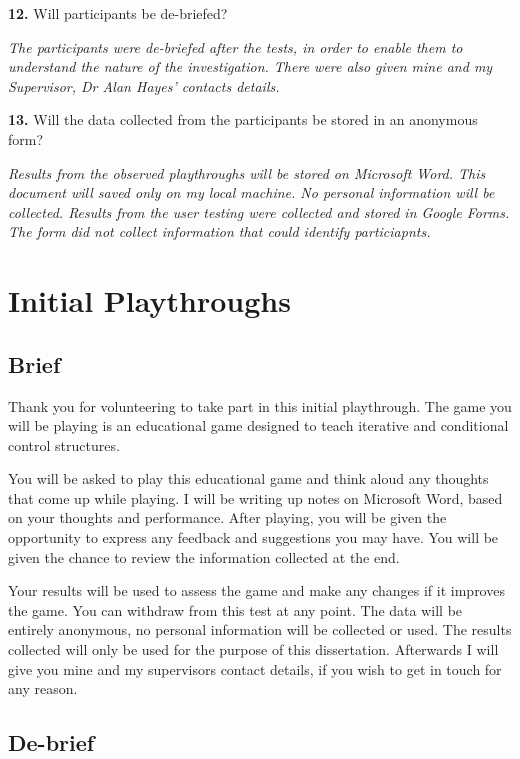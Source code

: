 \documentclass[a4paper,11.5pt]{report}
\numberwithin{figure}{section}
\numberwithin{table}{section}
\numberwithin{equation}{section}
\numberwithin{equation}{section}
\begin{document}
\textbf{12.}	Will participants be de-briefed?             

\textit{The participants were de-briefed after the tests, in order to enable them to understand the nature of the investigation. There were also given mine and my Supervisor, Dr Alan Hayes' contacts details.}                                  


\textbf{13.}	Will the data collected from the participants be stored in an anonymous form?                                                                       

\textit{Results from the observed playthroughs will be stored on Microsoft Word. This document will saved only on my local machine. No personal information will be collected. Results from the user testing were collected and stored in Google Forms. The form did not collect information that could identify particiapnts.}

\chapter{Initial Playthroughs} \label{app:initialplaythroughs}

\section{Brief}

Thank you for volunteering to take part in this initial playthrough. The game you will be playing is an educational game designed to teach iterative and conditional control structures. 

You will be asked to play this educational game and think aloud any thoughts that come up while playing. I will be writing up notes on Microsoft Word, based on your thoughts and performance. After playing, you will be given the opportunity to express any feedback and suggestions you may have. You will be given the chance to review the information collected at the end.

Your results will be used to assess the game and make any changes if it improves the game. You can withdraw from this test at any point. The data will be entirely anonymous, no personal information will be collected or used. The results collected will only be used for the purpose of this dissertation. Afterwards I will give you mine and my supervisors contact details, if you wish to get in touch for any reason.

\section{De-brief}
\end{document}
